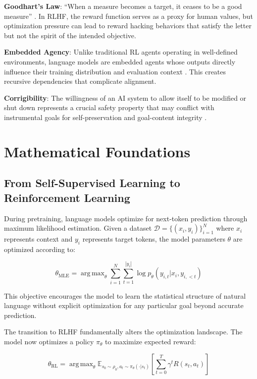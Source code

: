 \documentclass[11pt,a4paper]{article}
\DeclareMathOperator*{\argmax}{arg\,max}
\begin{document}
\textbf{Goodhart's Law}: ``When a measure becomes a target, it ceases to be a good measure'' \citep{strathern1997improving}. In RLHF, the reward function serves as a proxy for human values, but optimization pressure can lead to reward hacking behaviors that satisfy the letter but not the spirit of the intended objective.

\textbf{Embedded Agency}: Unlike traditional RL agents operating in well-defined environments, language models are embedded agents whose outputs directly influence their training distribution and evaluation context \citep{demski2019embedded}. This creates recursive dependencies that complicate alignment.

\textbf{Corrigibility}: The willingness of an AI system to allow itself to be modified or shut down represents a crucial safety property that may conflict with instrumental goals for self-preservation and goal-content integrity \citep{soares2015corrigibility}.

\section{Mathematical Foundations}

\subsection{From Self-Supervised Learning to Reinforcement Learning}

During pretraining, language models optimize for next-token prediction through maximum likelihood estimation. Given a dataset $\mathcal{D} = \{(x_i, y_i)\}_{i=1}^N$ where $x_i$ represents context and $y_i$ represents target tokens, the model parameters $\theta$ are optimized according to:

\begin{equation}
\theta_{\text{MLE}} = \argmax_\theta \sum_{i=1}^N \sum_{t=1}^{|y_i|} \log p_\theta(y_{i,t} | x_i, y_{i,<t})
\end{equation}

This objective encourages the model to learn the statistical structure of natural language without explicit optimization for any particular goal beyond accurate prediction.

The transition to RLHF fundamentally alters the optimization landscape. The model now optimizes a policy $\pi_\theta$ to maximize expected reward:

\begin{equation}
\theta_{\text{RL}} = \argmax_\theta \mathbb{E}_{s_0 \sim \rho_0, a_t \sim \pi_\theta(\cdot|s_t)} \left[ \sum_{t=0}^T \gamma^t R(s_t, a_t) \right]
\end{equation}
\end{document}
